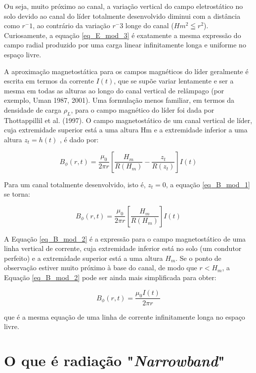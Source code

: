 \documentclass[a4paper, 12pt, onecolumn,singlespacing]{article}
\begin{document}
	Ou seja, muito próximo ao canal, a variação vertical do campo eletrostático no solo devido ao canal do líder totalmente desenvolvido diminui com a distância como $r^-1$, ao contrário da variação $r^-3$ longe do canal ($Hm^2 \leqq r^2$). Curiosamente, a equação \ref{eq_E_mod_3} é exatamente a mesma expressão do campo radial produzido por uma carga linear infinitamente longa e uniforme no espaço livre.
	
	A aproximação magnetostática para os campos magnéticos do líder geralmente é escrita em termos da corrente $I(t)$, que se supõe variar lentamente e ser a mesma em todas as alturas ao longo do canal vertical de relâmpago (por exemplo, Uman 1987, 2001). Uma formulação menos familiar, em termos da densidade de carga $\rho_L$, para o campo magnético do líder foi dada por Thottappillil et al. (1997). O campo magnetostático de um canal vertical de líder, cuja extremidade superior está a uma altura Hm e a extremidade inferior a uma altura $z_t = h(t)$ , é dado por:
	
	\begin{equation}
		B_\phi(r, t) = \frac{\mu_0}{2  \pi r} \left[\frac{H_m}{R(H_m)} - \frac{z_t}{R(z_t)}\right]I(t)
		\label{eq_B_mod_1}
	\end{equation}

	Para um canal totalmente desenvolvido, isto é, $z_t = 0$, a equação \eqref{eq_B_mod_1} se torna:
	
	\begin{equation}
		B_\phi(r, t) = \frac{\mu_0}{2  \pi r}\left[\frac{H_m}{R(H_m)}\right]I(t)
		\label{eq_B_mod_2}
	\end{equation}

	A Equação \ref{eq_B_mod_2} é a expressão para o campo magnetostático de uma linha vertical de corrente, cuja extremidade inferior está no solo (um condutor perfeito) e a extremidade superior está a uma altura $H_m$. Se o ponto de observação estiver muito próximo à base do canal, de modo que $r < H_m$, a Equação \ref{eq_B_mod_2} pode ser ainda mais simplificada para obter:
	
	\begin{equation}
		B_\phi(r, t) = \frac{\mu_0  I(t)}{2  \pi r}
	\end{equation}

	que é a mesma equação de uma linha de corrente infinitamente longa no espaço livre.

	
	\section{O que é radiação "\textit{Narrowband}"}
	
\end{document}
